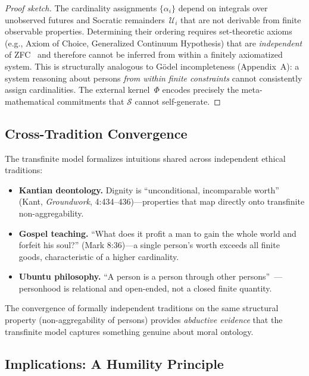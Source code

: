 \documentclass[11pt]{article}
\begin{document}
\begin{proof}[Proof sketch]
The cardinality assignments $\{\alpha_i\}$ depend on integrals over
unobserved futures and Socratic remainders~$\mathcal{U}_i$ that are
not derivable from finite observable properties. Determining their
ordering requires set-theoretic axioms (e.g., Axiom of Choice,
Generalized Continuum Hypothesis) that are \emph{independent} of
ZFC~\citep{cohen1963independence} and therefore cannot be inferred
from within a finitely axiomatized system. This is structurally
analogous to G\"odel incompleteness (Appendix~A): a system reasoning
about persons \emph{from within finite constraints} cannot
consistently assign cardinalities. The external kernel~$\Phi$ encodes
precisely the meta-mathematical commitments that $\mathcal{S}$ cannot
self-generate.
\end{proof}

\subsection{Cross-Tradition Convergence}

The transfinite model formalizes intuitions shared across independent
ethical traditions:

\begin{itemize}
    \item \textbf{Kantian deontology.} Dignity is ``unconditional,
          incomparable worth'' (Kant, \emph{Groundwork},
          4:434--436)---properties that map directly onto transfinite
          non-aggregability.
    \item \textbf{Gospel teaching.} ``What does it profit a man to gain the
          whole world and forfeit his soul?'' (Mark 8:36)---a single
          person's worth exceeds all finite goods, characteristic of a
          higher cardinality.
    \item \textbf{Ubuntu philosophy.} ``A person is a person through other
          persons''~\citep{metz2007ubuntu}---personhood is relational and
          open-ended, not a closed finite quantity.
\end{itemize}

The convergence of formally independent traditions on the same structural
property (non-aggregability of persons) provides \emph{abductive evidence}
that the transfinite model captures something genuine about moral ontology.

\subsection{Implications: A Humility Principle}
\end{document}
